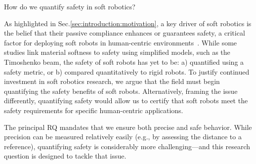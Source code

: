 \begin{researchquestion}\label{rq:soft_robotic_safety}
    How do we quantify safety in soft robotics?
\end{researchquestion}
As highlighted in Sec.\ref{sec:introduction:motivation}, a key driver of soft robotics is the belief that their passive compliance enhances or guarantees safety, a critical factor for deploying soft robots in human-centric environments~\citep{rus2015design, mengaldo2022concise}. While some studies link material softness to safety using simplified models, such as the Timoshenko beam\citep{abidi2017intrinsic}, the safety of soft robots has yet to be: a) quantified using a safety metric, 
or b) compared quantitatively to rigid robots.
To justify continued investment in soft robotics research, we argue that the field must begin quantifying the safety benefits of soft robots. Alternatively, framing the issue differently, quantifying safety would allow us to certify that soft robots meet the safety requirements for specific human-centric applications.

The principal \gls{RQ} mandates that we ensure both precise and safe behavior. While precision can be measured relatively easily (e.g., by assessing the distance to a reference), quantifying safety is considerably more challenging—and this research question is designed to tackle that issue.

